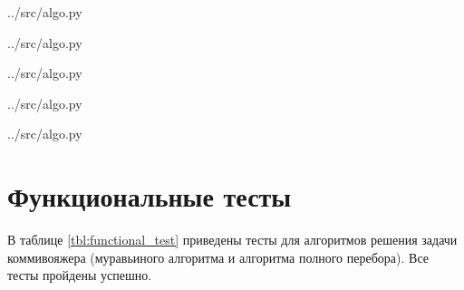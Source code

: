 \begin{lstinputlisting}[
	caption={Алгоритм полного перебора},
	label={lst:bruteforce},
	linerange={154-173}
	]{../src/algo.py}
\end{lstinputlisting}


\begin{lstinputlisting}[
	caption={Муравьиный алгоритм},
	label={lst:antalgo},
	linerange={101-129}
	]{../src/algo.py}
\end{lstinputlisting}

\begin{lstinputlisting}[
	caption={Функция для обновления феромонов},
	label={lst:pheromone},
	linerange={47-64}
	]{../src/algo.py}
\end{lstinputlisting}

\begin{lstinputlisting}[
	caption={Функция для нахождения вероятней перехода в каждый из городов},
	label={lst:probability},
	linerange={81-98}
	]{../src/algo.py}
\end{lstinputlisting}

\begin{lstinputlisting}[
	caption={Функция выбора следующего города},
	label={lst:nextcity},
	linerange={67-78}
	]{../src/algo.py}
\end{lstinputlisting}


\section{Функциональные тесты}

В таблице \ref{tbl:functional_test} приведены тесты для алгоритмов решения задачи коммивояжера (муравьиного алгоритма и алгоритма полного перебора).
Все тесты пройдены успешно.

